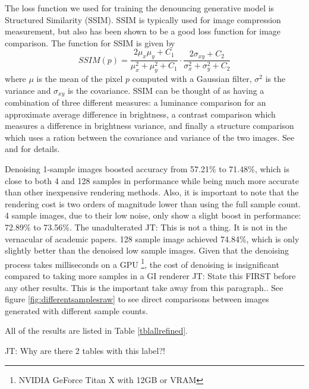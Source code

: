 \documentclass[10pt,twocolumn,letterpaper]{article}
\newcommand{\tompson}[1]{{\color{green} JT: #1}}
\begin{document}
The loss function we used for training the denouncing generative model is Structured Similarity (SSIM)\cite{Wang04imagequality}. SSIM is typically used for image compression measurement, but also has been shown to be a good loss function for image comparison. The function for SSIM is given by
$$SSIM(p)=\frac{2\mu_x\mu_y + C_1}{\mu_x^2+\mu_y^2+C_1}\cdot\frac{2\sigma_{xy}+C_2}{\sigma_x^2+\sigma_y^2+C_2}$$
where $\mu$ is the mean of the pixel $p$ computed with a Gaussian filter, $\sigma^2$ is the variance and $\sigma_{xy}$ is the covariance. SSIM can be thought of as having a combination of three different measures: a luminance comparison for an approximate average difference in brightness,  a contrast comparison which measures a difference in brightness variance, and finally a structure comparison which uses a ration between the covariance and variance of the two images.  See \cite{DBLP:journals/corr/ZhangSYSLJF16} and \cite{DBLP:journals/corr/ZhaoGFK15} for details.

Denoising 1-sample images boosted accuracy from 57.21\% to 71.48\%, which is close to both 4 and 128 samples in performance while being much more accurate than other inexpensive rendering methods. Also, it is important to note that the rendering cost is two orders of magnitude lower than using the full sample count. 4 sample images, due to their low noise, only show a slight boost in performance: 72.89\% to 73.56\%.  The unadulterated \tompson{This is not a thing. It is not in the vernacular of academic papers.} 128 sample image achieved 74.84\%, which is only slightly better than the denoised low sample images.  Given that the denoising process takes milliseconds on a GPU \footnote{NVIDIA GeForce Titan X with 12GB or VRAM}, the cost of denoising is insignificant compared to taking more samples in a GI renderer \tompson{State this FIRST before any other results. This is the important take away from this paragraph.}.  See figure \ref{fig:differentsamplesraw} to see direct comparisons between images generated with different sample counts.

All of the results are listed in Table \ref{tblallrefined}.

\tompson{Why are there 2 tables with this label?!}

\end{document}
